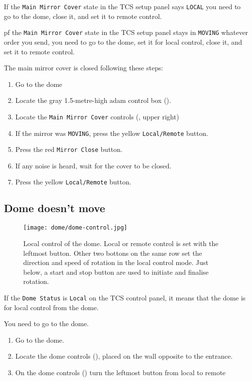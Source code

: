 \documentclass[11pt,fleqn,a4paper]{book}
\begin{document}
If the \texttt{Main Mirror Cover} state in the \gls{TCS setup panel} says
\texttt{LOCAL} you need to go to the dome, close it, and set it
to remote control.

pf the \texttt{Main Mirror Cover} state in the \gls{TCS setup panel} stays in
\texttt{MOVING} whatever order you send, you need to go to the dome, set it for local control, close it, and set it to remote control.
 

\label{proc:mainmirrorstuck}
The \gls{main mirror} cover is closed following these steps:
\begin{enumerate}
   \item Go to the \gls{dome}
   \item Locate the gray 1.5-metre-high \gls{adam} control box ().
   \item Locate the \texttt{Main Mirror Cover} controls (, upper right) 
   \item If the mirror was \texttt{MOVING}, press the yellow \texttt{Local/Remote} button.
   \item Press the red \texttt{Mirror Close} button.
   \item If any noise is heard, wait for the cover to be closed.
   \item Press the yellow \texttt{Local/Remote} button.
\end{enumerate} 


\subsection{Dome doesn't move}
\begin{figure}
\centering
\texttt{[image: dome/dome-control.jpg]}
\caption[Local control of the dome]{Local control of the \gls{dome}.  Local or remote control is set with the leftmost button.  Other two bottons on the same row set the direction and speed of rotation in the local control mode.  Just below, a start and stop button are used to initiate and finalise rotation.}
\label{fig:dome-control}
\end{figure}

If the \texttt{Dome Status} is \texttt{Local} on the \gls{TCS control panel}, it means that the dome is for local control from the dome.

You need to go to the \gls{dome}.

\begin{enumerate}
   \item Go to the dome.
   \item Locate the dome controls (), placed on the wall opposite to the entrance.
   \item On the dome controls () turn the leftmost button from local to remote
\end{enumerate}
\end{document}
